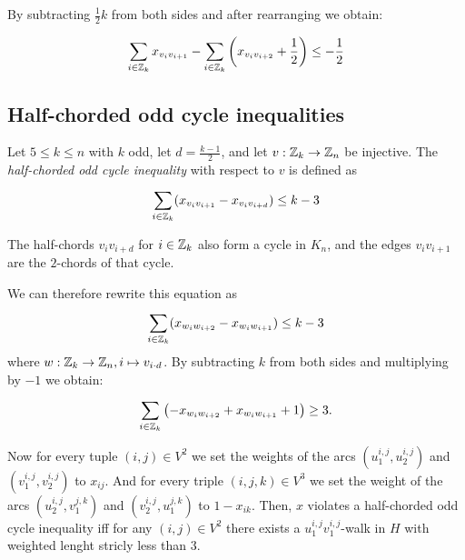 By subtracting $\frac{1}{2}k$ from both sides and after rearranging we obtain:

\begin{equation*}
	\sum_{i \in \mathbb{Z}_k} x_{v_i v_{i+1}} - \sum_{i \in \mathbb{Z}_k} \left(x_{v_i v_{i+2}} + \frac{1}{2} \right) \leq -\frac{1}{2}
\end{equation*}

\subsection{Half-chorded odd cycle inequalities}\label{subsec:half_chorded_separator}

\begin{definition}\label{def:half-chorded}
Let $5 \leq k \leq n$ with $k$ odd, let $d = \frac{k-1}{2}$, and let $v: \mathbb{Z}_{k} \to \mathbb{Z}_{n}$ be injective.
The \textit{half-chorded odd cycle inequality} with respect to $v$ is defined as
\begin{equation}\label{eq:half-chorded}
	\sum_{i \in \mathbb{Z}_{k}}^{} (x_{v_{i} v_{i+1}} - x_{v_{i} v_{i+d} }) \leq k - 3
\end{equation}
\end{definition}
\begin{note}
	The half-chords $v_{i}v_{i+d}$ for $i \in \mathbb{Z}_{k}$ also form a cycle in $K_{n}$, and the edges $v_{i}v_{i+1}$ are the $2$-chords of that cycle.
\end{note}
We can therefore rewrite this equation as
\begin{equation*}
\sum_{i \in \mathbb{Z}_{k}}^{} (x_{w_{i}w_{i+2}} - x_{w_{i}w_{i+1}}) \leq k-3
\end{equation*}
where $w: \mathbb{Z}_{k} \to \mathbb{Z}_{n}, i \mapsto v_{i \cdot d}$.
By subtracting $k$ from both sides and multiplying by $-1$ we obtain:
\begin{equation*}
	\sum_{i \in \mathbb{Z}_{k}}^{} \left( -x_{w_{i}w_{i+2}} + x_{w_{i}w_{i+1}} + 1 \right) \geq 3.
\end{equation*}

Now for every tuple $(i,j) \in V^{2}$ we set the weights of the arcs $(u_{1}^{i,j}, u_{2}^{i,j})$ and $(v_{1}^{i,j}, v_{2}^{i,j})$ to $x_{ij}$.
And for every triple $(i,j,k) \in V^{3}$ we set the weight of the arcs $(u_{2}^{i,j}, v_{1}^{j,k})$ and $(v_{2}^{i,j}, u_{1}^{j,k})$ to $1-x_{ik}$.
Then, $x$ violates a half-chorded odd cycle inequality iff for any $(i,j) \in V^{2}$ there exists a $u_{1}^{i,j}v_{1}^{i,j}$-walk in $H$ with weighted lenght stricly less than 3.
